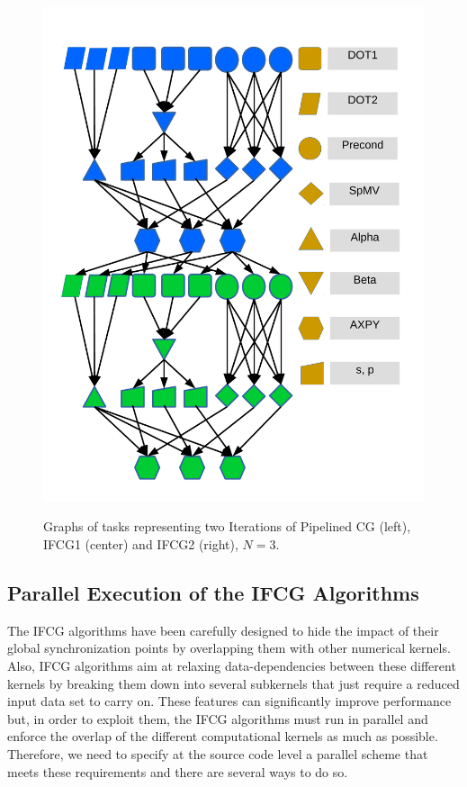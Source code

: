 \begin{figure}[bhtp]
{                \includegraphics[scale=0.30]{ifcg/figs/charts/ifcg2.pdf}
        }
        \vspace{-0.6cm}
        \caption{Graphs of tasks representing two Iterations of Pipelined CG (left), IFCG1 (center) and IFCG2 (right), $N=3$.}
        \label{tdg}
\end{figure}

\subsection{Parallel Execution of the IFCG Algorithms}
\label{sec:ifcg_implementation}

The IFCG algorithms have been carefully designed to hide the impact of their global synchronization points by overlapping them with other numerical kernels.
Also, IFCG algorithms aim at relaxing data-dependencies between these different kernels by breaking them down into several subkernels that just require a reduced input data set to carry on.
These features can significantly improve performance but, in order to exploit them,
the IFCG algorithms must run in parallel and enforce the overlap of the different computational kernels as much as possible.
Therefore, we need to specify at the source code level a parallel scheme that meets these requirements
and there are several ways to do so. 

